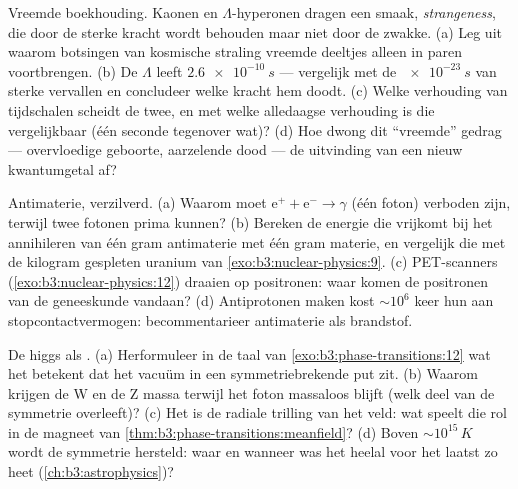 \begin{exercise}[$\star\star$]\label{exo:b3:particle-physics:7}
Vreemde boekhouding. Kaonen en $\Lambda$-hyperonen dragen een
smaak, \emph{strangeness}, die door de sterke kracht wordt behouden maar
niet door de zwakke. (a) Leg uit waarom botsingen van kosmische straling
vreemde deeltjes alleen in paren voortbrengen. (b) De $\Lambda$ leeft
$\qty{2.6e-10}{s}$ --- vergelijk met de $\qty{e-23}{s}$ van
sterke vervallen en concludeer welke kracht hem doodt. (c) Welke verhouding
van tijdschalen scheidt de twee, en met welke alledaagse verhouding is
die vergelijkbaar (één seconde tegenover wat)? (d) Hoe dwong dit
``vreemde'' gedrag --- overvloedige geboorte, aarzelende dood ---
de uitvinding van een nieuw kwantumgetal af?
\end{exercise}

\begin{exercise}[$\star\star$]\label{exo:b3:particle-physics:8}
Antimaterie, verzilverd. (a) Waarom moet
$\text{e}^+ + \text{e}^- \to \gamma$ (één foton) verboden zijn,
terwijl twee fotonen prima kunnen? (b) Bereken de energie die vrijkomt bij het
annihileren van één gram antimaterie met één gram materie, en
vergelijk die met de kilogram gespleten uranium van
\cref{exo:b3:nuclear-physics:9}. (c) PET-scanners
(\cref{exo:b3:nuclear-physics:12}) draaien op positronen: waar komen
de positronen van de geneeskunde vandaan? (d) Antiprotonen maken kost
$\sim10^{6}$ keer hun  aan stopcontactvermogen: becommentarieer
antimaterie als brandstof.
\end{exercise}

\begin{exercise}[$\star\star\star$]\label{exo:b3:particle-physics:9}
De higgs als . (a) Herformuleer in de taal van
\cref{exo:b3:phase-transitions:12} wat het betekent dat het
vacuüm in een symmetriebrekende put zit. (b) Waarom krijgen de W en de Z
massa terwijl het foton massaloos blijft (welk deel van de
symmetrie overleeft)? (c) Het  is de radiale trilling van het
veld: wat speelt die rol in de magneet van
\cref{thm:b3:phase-transitions:meanfield}? (d) Boven
$\sim10^{15}\,\unit{K}$ wordt de symmetrie hersteld: waar en wanneer
was het heelal voor het laatst zo heet (\cref{ch:b3:astrophysics})?
\end{exercise}

